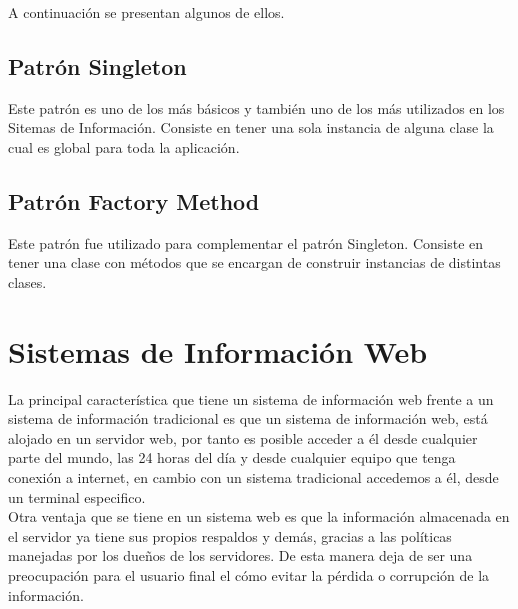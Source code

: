 A continuaci\'on se presentan algunos de ellos.

\subsection{Patr\'on Singleton}
Este patr\'on es uno de los m\'as b\'asicos y tambi\'en uno de los m\'as utilizados en los Sitemas de Informaci\'on. Consiste en tener una sola instancia de alguna clase la cual es global para toda la aplicaci\'on.

\subsection{Patr\'on Factory Method}
Este patr\'on fue utilizado para complementar el patr\'on Singleton. Consiste en tener una clase con m\'etodos que se encargan de construir instancias de distintas clases.

\section{Sistemas de Informaci\'on Web}
La principal caracter\'istica que tiene un sistema de informaci\'on web frente a un sistema de informaci\'on tradicional es que un sistema de informaci\'on web, est\'a alojado en un servidor web, por tanto es posible acceder a \'el desde cualquier parte del mundo, las 24 horas del d\'ia y desde cualquier equipo que tenga conexi\'on a internet, en cambio con un sistema tradicional accedemos a \'el, desde un terminal especifico.\\

Otra ventaja que se tiene en un sistema web es que la informaci\'on almacenada en el servidor ya tiene sus propios respaldos y dem\'as, gracias a las pol\'iticas manejadas por los due\~nos de  los servidores. De esta manera deja de ser una preocupaci\'on para el usuario final el c\'omo evitar la p\'erdida o corrupci\'on de la informaci\'on.

\clearpage
